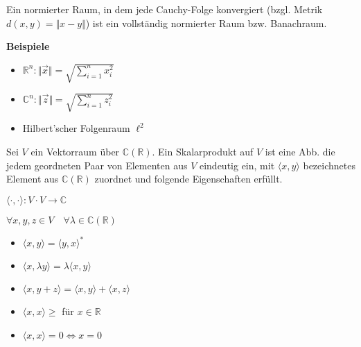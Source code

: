 \begin{Def}
	Ein normierter Raum, in dem jede Cauchy-Folge konvergiert (bzgl. Metrik $d(x,y) = \Vert x-y \Vert$)
	ist ein vollständig normierter Raum bzw. Banachraum.
\end{Def}


\textbf{Beispiele}
\begin{itemize}
	\item $\mathbb{R}^n: \Vert \vec x \Vert = \sqrt{\sum_{i=1}^n x_i^2}$
	\item $\mathbb{C}^n: \Vert \vec z \Vert = \sqrt{\sum_{i=1}^n z_i^2}$
	\item Hilbert'scher Folgenraum $\ell^2$
\end{itemize}

\begin{Def}
	Sei $V$ ein Vektorraum über $\mathbb{C} (\mathbb{R})$.
	Ein Skalarprodukt auf $V$ ist eine Abb. die jedem geordneten Paar von
	Elementen aus $V$ eindeutig ein, mit $\langle x,y\rangle$ bezeichnetes Element aus
	$\mathbb{C} (\mathbb{R})$ zuordnet und folgende Eigenschaften erfüllt.

	$\langle\cdot,\cdot \rangle: V\cdot V \rightarrow \mathbb{C}$ 
	
	$\forall x,y,z \in V \quad \forall \lambda \in \mathbb{C} (\mathbb{R})$

	\begin{itemize}
		\item $\langle x,y\rangle = \langle y,x\rangle^\ast$
		\item $\langle x,\lambda y\rangle = \lambda \langle x,y\rangle$
		\item $\langle x,y+z\rangle = \langle x,y\rangle + \langle x,z\rangle$
		\item $\langle x,x\rangle \geq$ für $ x \in \mathbb{R}$
		\item $\langle x,x\rangle = 0 \Leftrightarrow x=0$
	\end{itemize}
\end{Def}


